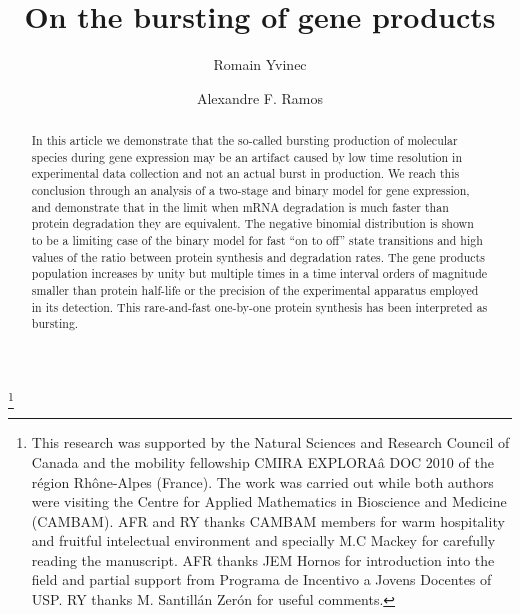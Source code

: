 
\usepackage{graphicx}
\usepackage{dcolumn}
\usepackage{bm}
\usepackage{color}
\usepackage{amsmath}
\usepackage{natbib}





\title{On the bursting of gene products}


\author{Romain Yvinec}
\author{Alexandre F. Ramos}
\thanks{This research was supported by the Natural Sciences and Research Council of Canada and the mobility fellowship CMIRA EXPLORAâ DOC 2010 of the r\'egion Rh\^one-Alpes (France). The work was carried out while both authors were visiting the Centre for Applied Mathematics in Bioscience and Medicine (CAMBAM). AFR and RY thanks CAMBAM members for warm hospitality and fruitful intelectual environment and specially M.C Mackey for carefully reading the manuscript. AFR thanks JEM Hornos for introduction into the field and partial support from Programa de Incentivo a Jovens Docentes of USP. RY thanks M. Santill\'an Zer\'on for useful comments.}


\begin{abstract}
In this article we demonstrate that the so-called bursting production of molecular species during
gene expression may be an artifact caused by low time resolution in experimental data collection 
and not an actual burst in production.
We reach this conclusion through an analysis of a
two-stage and binary model for gene expression, and
demonstrate that in the limit when mRNA degradation is
much faster than protein degradation they are equivalent.
The negative binomial distribution
is shown to be a limiting case of the binary model for
fast ``on to off'' state transitions and
high values of the ratio between protein
synthesis and degradation rates.
The gene products population increases by unity but
multiple times in a time interval orders of magnitude
smaller than protein half-life or the precision
of the experimental apparatus employed in its detection.
This rare-and-fast one-by-one protein synthesis has been
interpreted as bursting.
\end{abstract}


